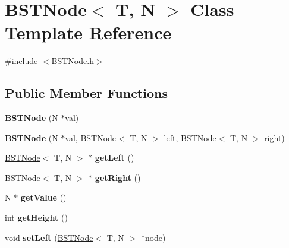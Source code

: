 \hypertarget{class_b_s_t_node}{}\section{B\+S\+T\+Node$<$ T, N $>$ Class Template Reference}
\label{class_b_s_t_node}


{\ttfamily \#include $<$B\+S\+T\+Node.\+h$>$}

\subsection*{Public Member Functions}
\begin{DoxyCompactItemize}
\item 
\mbox{\label{class_b_s_t_node_abf43af549af98d6454d6cab63278ecd7}} 
{\bfseries B\+S\+T\+Node} (N $\ast$val)
\item 
\mbox{\label{class_b_s_t_node_a8b3e29fac992d551b9f4085c87afeb4e}} 
{\bfseries B\+S\+T\+Node} (N $\ast$val, \hyperlink{class_b_s_t_node}{B\+S\+T\+Node}$<$ T, N $>$ left, \hyperlink{class_b_s_t_node}{B\+S\+T\+Node}$<$ T, N $>$ right)
\item 
\mbox{\label{class_b_s_t_node_ad05ca59e79b2b56b9f45249434fe72c0}} 
\hyperlink{class_b_s_t_node}{B\+S\+T\+Node}$<$ T, N $>$ $\ast$ {\bfseries get\+Left} ()
\item 
\mbox{\label{class_b_s_t_node_ab6f61ecaa4cef32f62f8194abaad4b52}} 
\hyperlink{class_b_s_t_node}{B\+S\+T\+Node}$<$ T, N $>$ $\ast$ {\bfseries get\+Right} ()
\item 
\mbox{\label{class_b_s_t_node_a67f25f4cfd925f2d6a6715ec246601da}} 
N $\ast$ {\bfseries get\+Value} ()
\item 
\mbox{\label{class_b_s_t_node_a7137381496555597e2809ea3e1b18f8c}} 
int {\bfseries get\+Height} ()
\item 
\mbox{\label{class_b_s_t_node_aaae2f112b6b2d93e3916dbeda8b65117}} 
void {\bfseries set\+Left} (\hyperlink{class_b_s_t_node}{B\+S\+T\+Node}$<$ T, N $>$ $\ast$node)
\item 
\mbox{\label{class_b_s_t_node_a95d68f8bf6ceb83137ac5206ca38c7e9}} 

\end{DoxyCompactItemize}
